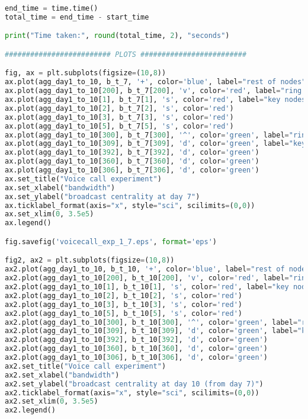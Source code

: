 \begin{lstlisting}[language=Python, caption=Second synthetic experiment]
end_time = time.time()
total_time = end_time - start_time

print("Time taken:", round(total_time, 2), "seconds")

######################### PLOTS #########################

fig, ax = plt.subplots(figsize=(10,8))
ax.plot(agg_day1_to_10, b_t_7, '+', color='blue', label="rest of nodes")
ax.plot(agg_day1_to_10[200], b_t_7[200], 'v', color='red', label="ring leader ID before day 7")
ax.plot(agg_day1_to_10[1], b_t_7[1], 's', color='red', label="key nodes IDs before day 7")
ax.plot(agg_day1_to_10[2], b_t_7[2], 's', color='red') 
ax.plot(agg_day1_to_10[3], b_t_7[3], 's', color='red') 
ax.plot(agg_day1_to_10[5], b_t_7[5], 's', color='red')
ax.plot(agg_day1_to_10[300], b_t_7[300], '^', color='green', label="ring leader ID after day 7")
ax.plot(agg_day1_to_10[309], b_t_7[309], 'd', color='green', label="key nodes IDs after day 7")
ax.plot(agg_day1_to_10[392], b_t_7[392], 'd', color='green') 
ax.plot(agg_day1_to_10[360], b_t_7[360], 'd', color='green') 
ax.plot(agg_day1_to_10[306], b_t_7[306], 'd', color='green')
ax.set_title("Voice call experiment")
ax.set_xlabel("bandwidth")
ax.set_ylabel("broadcast centrality at day 7")
ax.ticklabel_format(axis="x", style="sci", scilimits=(0,0))
ax.set_xlim(0, 3.5e5)
ax.legend()

fig.savefig('voicecall_exp_1_7.eps', format='eps')

fig2, ax2 = plt.subplots(figsize=(10,8))
ax2.plot(agg_day1_to_10, b_t_10, '+', color='blue', label="rest of nodes")
ax2.plot(agg_day1_to_10[200], b_t_10[200], 'v', color='red', label="ring leader ID before day 7")
ax2.plot(agg_day1_to_10[1], b_t_10[1], 's', color='red', label="key nodes IDs before day 7")
ax2.plot(agg_day1_to_10[2], b_t_10[2], 's', color='red') 
ax2.plot(agg_day1_to_10[3], b_t_10[3], 's', color='red') 
ax2.plot(agg_day1_to_10[5], b_t_10[5], 's', color='red')
ax2.plot(agg_day1_to_10[300], b_t_10[300], '^', color='green', label="ring leader ID after day 7") 
ax2.plot(agg_day1_to_10[309], b_t_10[309], 'd', color='green', label="key nodes IDs after day 7")
ax2.plot(agg_day1_to_10[392], b_t_10[392], 'd', color='green') 
ax2.plot(agg_day1_to_10[360], b_t_10[360], 'd', color='green') 
ax2.plot(agg_day1_to_10[306], b_t_10[306], 'd', color='green')
ax2.set_title("Voice call experiment")
ax2.set_xlabel("bandwidth")
ax2.set_ylabel("broadcast centrality at day 10 (from day 7)")
ax2.ticklabel_format(axis="x", style="sci", scilimits=(0,0))
ax2.set_xlim(0, 3.5e5)
ax2.legend()


\end{lstlisting}
